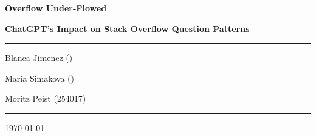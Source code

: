 \documentclass[12pt]{article}
\begin{document}
\begin{titlepage}
	\centering
	\par\vspace{0.75cm}
	{\huge\bfseries Overflow Under-Flowed\par}
    {\large\bfseries ChatGPT's Impact on Stack Overflow Question Patterns \par}
	\vspace{0.25cm}
    \noindent\rule{\textwidth}{1pt}
    {\Large Blanca Jimenez ()\par}
    {\Large Maria Simakova ()\par}
	{\Large Moritz Peist (254017)\par}
    \noindent\rule{\textwidth}{1pt}
    \tableofcontents
	\vfill

	{\large \today\par}
\end{titlepage}

\newpage





\newpage


\printbibliography[heading=bibintoc,title={References}]
\end{document}
